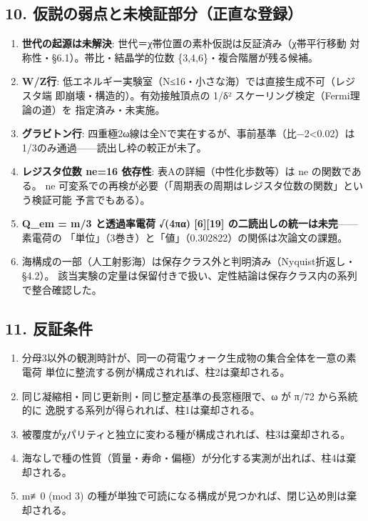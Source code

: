 \documentclass[
]{ltjsarticle}
\providecommand{\tightlist}{%
  \setlength{\itemsep}{0pt}\setlength{\parskip}{0pt}}
\begin{document}
\subsection{10.
仮説の弱点と未検証部分（正直な登録）}\label{ux4eeeux8aacux306eux5f31ux70b9ux3068ux672aux691cux8a3cux90e8ux5206ux6b63ux76f4ux306aux767bux9332}

\begin{enumerate}
\def\labelenumi{\arabic{enumi}.}
\tightlist
\item
  \textbf{世代の起源は未解決}:
  世代＝χ帯位置の素朴仮説は反証済み（χ帯平行移動
  対称性・§6.1）。帯比・結晶学的位数 \{3,4,6\}・複合階層が残る候補。
\item
  \textbf{W/Z行}:
  低エネルギー実験室（N≤16・小さな海）では直接生成不可（レジスタ端
  即崩壊・構造的）。有効接触頂点の 1/δ²
  スケーリング検定（Fermi理論の道）を 指定済み・未実施。
\item
  \textbf{グラビトン行}:
  四重極2ω線は全Nで実在するが、事前基準（\textbar 比−2\textbar\textless0.02）は
  1/3のみ通過------読出し枠の較正が未了。
\item
  \textbf{レジスタ位数 ne=16 依存性}: 表Aの詳細（中性化歩数等）は ne
  の関数である。 ne
  可変系での再検が必要（「周期表の周期はレジスタ位数の関数」という検証可能
  予言でもある）。
\item
  \textbf{Q\_em = m/3 と透過率電荷 √(4πα) {[}6{]}{[}19{]}
  の二読出しの統一は未完}------素電荷の
  「単位」（3巻き）と「値」（0.302822）の関係は次論文の課題。
\item
  海構成の一部（人工射影海）は保存クラス外と判明済み（Nyquist折返し・§4.2）。
  該当実験の定量は保留付きで扱い、定性結論は保存クラス内の系列で整合確認した。
\end{enumerate}

\subsection{11. 反証条件}\label{ux53cdux8a3cux6761ux4ef6}

\begin{enumerate}
\def\labelenumi{\arabic{enumi}.}
\tightlist
\item
  分母3以外の観測時計が、同一の荷電ウォーク生成物の集合全体を一意の素電荷
  単位に整流する例が構成されれば、柱2は棄却される。
\item
  同じ凝縮相・同じ更新則・同じ整定基準の長窓極限で、ω が π/72
  から系統的に 逸脱する系列が得られれば、柱1は棄却される。
\item
  被覆度がχパリティと独立に変わる種が構成されれば、柱3は棄却される。
\item
  海なしで種の性質（質量・寿命・偏極）が分化する実測が出れば、柱4は棄却される。
\item
  m≢0 (mod 3)
  の種が単独で可読になる構成が見つかれば、閉じ込め則は棄却される。
\end{enumerate}
\end{document}
